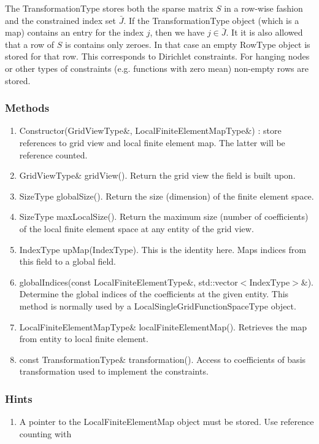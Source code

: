 \documentclass[11pt,a4paper,DIV11,%
notitlepage,oneside,abstracton,%
bibtotoc]{scrartcl}
\begin{document}
The TransformationType stores both the sparse matrix $S$ in a row-wise
fashion and the constrained
index set $\bar{J}$. If the TransformationType object (which is a map)
contains an entry for the index $j$, then we have $j\in\bar{J}$. It
it is also allowed that a row of $S$ is contains only zeroes. In that
case an empty RowType object is stored for that row. This corresponds
to Dirichlet constraints. For hanging nodes or other types of
constraints (e.g. functions with zero mean) non-empty rows are stored. 

\subsubsection{Methods}

\begin{enumerate}[1)]
\item Constructor(GridViewType\&, LocalFiniteElementMapType\&) : store
  references to grid view and local finite element map. The latter
  will be reference counted.
\item GridViewType\& gridView(). Return the grid view 
  the field is built upon.
\item SizeType globalSize(). Return the size (dimension) of the
  finite element space.  
\item SizeType maxLocalSize(). Return the maximum size (number of
  coefficients) of the local finite element space at any entity of the
  grid view.
\item IndexType upMap(IndexType). This is the identity here. Maps
  indices from this field to a global field.
\item globalIndices(const LocalFiniteElementType\&, std::vector$<$IndexType$>$\&).
  Determine the global indices of the
  coefficients at the given entity. This method is normally used by a
  LocalSingleGridFunctionSpaceType object.
\item LocalFiniteElementMapType\& localFiniteElementMap(). Retrieves
  the map from entity to local finite element.
\item const TransformationType\& transformation(). Access to
  coefficients of basis transformation used to implement the constraints.
\end{enumerate}

\subsubsection{Hints}

\begin{enumerate}[1)]
\item A pointer to the LocalFiniteElementMap object must be
  stored. Use reference counting with  
\end{enumerate}
\end{document}
